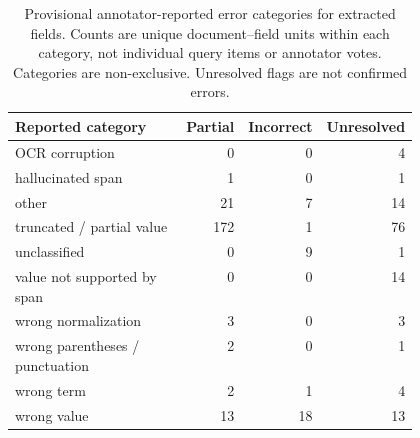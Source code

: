 \begin{table}[t]
\centering
\caption{Provisional annotator-reported error categories for extracted fields. Counts are unique document--field units within each category, not individual query items or annotator votes. Categories are non-exclusive. Unresolved flags are not confirmed errors.}
\begin{tabular}{p{0.47\linewidth}rrr}
\toprule
Reported category & Partial & Incorrect & Unresolved \\
\midrule
OCR corruption & 0 & 0 & 4 \\
hallucinated span & 1 & 0 & 1 \\
other & 21 & 7 & 14 \\
truncated / partial value & 172 & 1 & 76 \\
unclassified & 0 & 9 & 1 \\
value not supported by span & 0 & 0 & 14 \\
wrong normalization & 3 & 0 & 3 \\
wrong parentheses / punctuation & 2 & 0 & 1 \\
wrong term & 2 & 1 & 4 \\
wrong value & 13 & 18 & 13 \\
\bottomrule
\end{tabular}
\label{tab:validation-errors}
\end{table}
